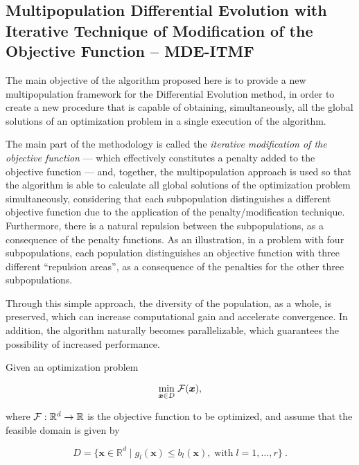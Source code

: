 \documentclass[smallextended]{svjour3}       %
\begin{document}
\subsection{Multipopulation Differential Evolution with Iterative Technique of Modification of the Objective Function -- MDE-ITMF}
\label{sec:MDEITMF}

The main objective of the algorithm proposed here is to provide a new multipopulation framework for the Differential Evolution method, in order to create a new procedure that is capable of obtaining, simultaneously, all the global solutions of an optimization problem in a single execution of the algorithm.

The main part of the methodology is called the \textit{iterative modification of the objective function} --- which effectively constitutes a penalty added to the objective function --- and, together, the multipopulation approach is used so that the algorithm is able to calculate all global solutions of the optimization problem simultaneously, considering that each subpopulation distinguishes a different objective function due to the application of the penalty/modification technique. Furthermore, there is a natural repulsion between the subpopulations, as a consequence of the penalty functions. As an illustration, in a problem with four subpopulations, each population distinguishes an objective function with three different ``repulsion areas'', as a consequence of the penalties for the other three subpopulations.

Through this simple approach, the diversity of the population, as a whole,  is preserved, which can increase computational gain and accelerate convergence. In addition, the algorithm naturally becomes parallelizable, which guarantees the possibility of increased performance.

Given an optimization problem

\begin{equation}
\underset{\boldsymbol{x} \in D}{\min} \; {\cal{F}}(\boldsymbol{x}),
\end{equation}

\noindent where ${\cal{F}}: \mathbb{R}^{d} \rightarrow \mathbb{R}$ is the objective function to be optimized, and assume that the feasible domain is given by

\begin{equation} 
D = \{\boldsymbol{x} \in \mathbb{R}^{d} \mid g_{l} (\boldsymbol{x}) \leq b_{l} (\boldsymbol{x}), \; \text{with} \; l = {1, \dots, r}\} \: . 
\label{eq:dxe}
\end{equation}
\end{document}
